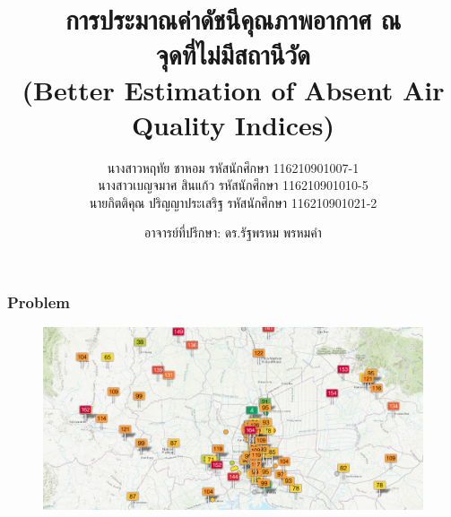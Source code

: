 \documentclass[12pt,aspectratio=169]{beamer}
\begin{document}
\title{การประมาณค่าดัชนีคุณภาพอากาศ ณ \\จุดที่ไม่มีสถานีวัด \\ (Better Estimation of Absent Air Quality Indices) } 
\date{อาจารย์ที่ปรึกษา: ดร.รัฐพรหม พรหมคำ}
\author{นางสาวหฤทัย ชาหอม รหัสนักศึกษา 116210901007-1 \\
นางสาวเบญจมาศ สินแก้ว รหัสนักศึกษา 116210901010-5 \\ 
นายกิตติคุณ ปริญญาประเสริฐ รหัสนักศึกษา 116210901021-2}

\maketitle

\begin{frame}
    \frametitle{Problem}
        \begin{figure}
            \centering
            \includegraphics[scale=0.13]{img/missing-station-aqi.png}
        \end{figure}
    \end{frame}
\end{document}
